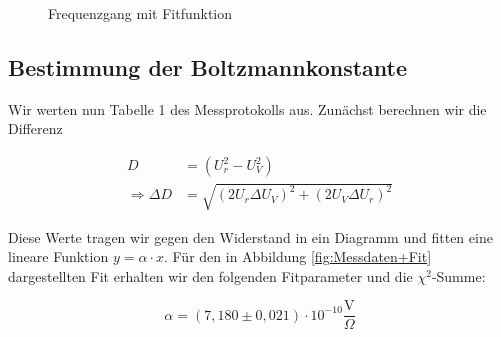 \documentclass{article}
\begin{document}
\phantom{.}

\begin{figure}[!h]
    \centering
    \caption{Frequenzgang mit Fitfunktion}
    \label{fig:Frequenzgang+Fit}
\end{figure}


\newpage

\subsection{Bestimmung der Boltzmannkonstante}

Wir werten nun Tabelle 1 des Messprotokolls aus. Zunächst berechnen wir die Differenz

\begin{equation}
    \begin{split}
        D &= (U_{r}^2 - U_V^2) \\
        \Rightarrow \Delta D &= \sqrt{(2 U_r \Delta U_V)^2 + (2 U_V \Delta U_r)^2}
    \end{split}
\end{equation}

Diese Werte tragen wir gegen den Widerstand in ein Diagramm und fitten eine lineare Funktion $y = \alpha \cdot x$. Für den in Abbildung \ref{fig:Messdaten+Fit} dargestellten Fit erhalten wir den folgenden Fitparameter und die $\chi^2$-Summe:

\begin{equation}
        \alpha = (7,180 \pm 0,021) \cdot 10^{-10} \frac{\text{V}}{\Omega}
\end{equation}
\end{document}
